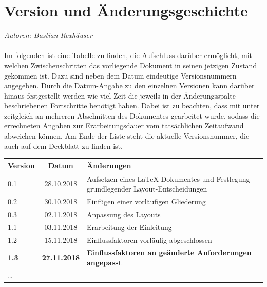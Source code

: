 \documentclass[enabledeprecatedfontcommands,fontsize=11pt,paper=a4,twoside]{scrartcl}
\newcounter{one}
\renewcommand{\headrulewidth}{0pt}
\begin{document}
  \thispagestyle{fancy}
  \fancyhead{}
  \fancyfoot{}
  \renewcommand{\headrulewidth}{0.4pt}
  \tableofcontents

\newpage



\section*{Version und Änderungsgeschichte}
\emph{Autoren: Bastian Rexhäuser}\\ \\
Im folgenden ist eine Tabelle zu finden, die Aufschluss darüber ermöglicht, mit welchen Zwischenschritten das vorliegende Dokument in seinen jetzigen Zustand gekommen ist. Dazu sind neben dem Datum eindeutige Versionsnummern angegeben. Durch die Datum-Angabe zu den einzelnen Versionen kann darüber hinaus festgestellt werden wie viel Zeit die jeweils in der Änderungsspalte beschriebenen Fortschritte benötigt haben. Dabei ist zu beachten, dass mit unter zeitgleich an mehreren Abschnitten des Dokumentes gearbeitet wurde, sodass die errechneten Angaben zur Erarbeitungsdauer vom tatsächlichen Zeitaufwand abweichen können. Am Ende der Liste steht die aktuelle Versionsnummer, die auch auf dem Deckblatt zu finden ist.  \\

\begin{tabular}{p{}cp{12cm}}
Version & Datum & Änderungen \\
\hline
0.1 & 28.10.2018 & Aufsetzen eines LaTeX-Dokumentes  und Festlegung grundlegender Layout-Entscheidungen \\
0.2 & 30.10.2018 & Einfügen einer vorläufigen Gliederung \\
0.3 & 02.11.2018 & Anpassung des Layouts \\
1.1 & 03.11.2018 & Erarbeitung der Einleitung \\
1.2 & 15.11.2018 & Einflussfaktoren vorläufig abgeschlossen \\
\textbf{1.3} & \textbf{27.11.2018} & \textbf{Einflussfaktoren an geänderte Anforderungen angepasst} \\
\ldots
\end{tabular}
\\ \\ \\
\end{document}
